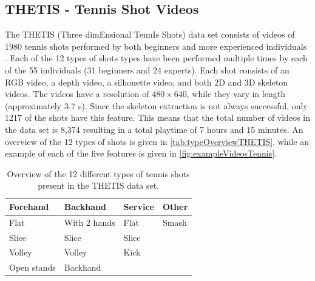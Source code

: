 \subsection{THETIS - Tennis Shot Videos}
The THETIS (Three dimEnsional TennIs Shots) data set consists of videos of 1980 tennis shots performed by both beginners and more experienced individuals \cite{Gourgari2013}. Each of the 12 types of shots types have been performed multiple times by each of the 55 individuals (31 beginners and 24 experts). Each shot consists of an RGB video, a depth video, a silhouette video, and both 2D and 3D skeleton videos. The videos have a resolution of $480\times 640$, while they vary in length (approximately 3-7 s). Since the skeleton extraction is not always successful, only 1217 of the shots have this feature. This means that the total number of videos in the data set is 8,374 resulting in a total playtime of 7 hours and 15 minutes. An overview of the 12 types of shots is given in \autoref{tab:typeOverviewTHETIS}, while an example of each of the five features is given in \autoref{fig:exampleVideosTennis}. 

\begin{table}
\centering
\caption{Overview of the 12 different types of tennis shots present in the THETIS data set.}
\label{tab:typeOverviewTHETIS}
\begin{tabular}{l|l|l|l}
\textbf{Forehand}    & \textbf{Backhand}     & \textbf{Service} & \textbf{Other} \\ \hline
Flat        & With 2 hands & Flat    & Smash \\
Slice       & Slice        & Slice   &       \\
Volley      & Volley       & Kick    &       \\
Open stands & Backhand     &         &      
\end{tabular}
\end{table}

